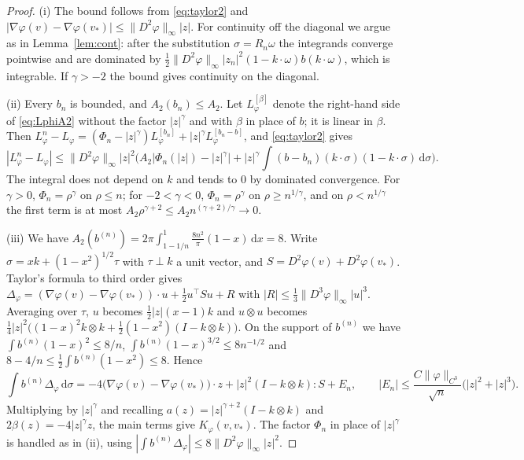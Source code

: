\documentclass[11pt]{amsart}
\theoremstyle{definition}
\newcommand{\dd}{\,\mathrm{d}}
\begin{document}
\begin{proof}
(i) The bound follows from \eqref{eq:taylor2} and $|\nabla\varphi(v)-\nabla\varphi(v_*)|\le\|D^2\varphi\|_\infty|z|$. For continuity off the diagonal we argue as in Lemma~\ref{lem:cont}: after the substitution $\sigma=R_n\omega$ the integrands converge pointwise and are dominated by $\frac12\|D^2\varphi\|_\infty|z_n|^2(1-k\cdot\omega)b(k\cdot\omega)$, which is integrable. If $\gamma>-2$ the bound gives continuity on the diagonal.

(ii) Every $b_n$ is bounded, and $A_2(b_n)\le A_2$. Let $L^{[\beta]}_\varphi$ denote the right-hand side of \eqref{eq:LphiA2} without the factor $|z|^\gamma$ and with $\beta$ in place of $b$; it is linear in $\beta$. Then $L^n_\varphi-L_\varphi=(\Phi_n-|z|^\gamma)L^{[b_n]}_\varphi+|z|^\gamma L^{[b_n-b]}_\varphi$, and \eqref{eq:taylor2} gives
\[
|L^n_\varphi-L_\varphi|\le\|D^2\varphi\|_\infty|z|^2\Big(A_2\big|\Phi_n(|z|)-|z|^\gamma\big|+|z|^\gamma\int(b-b_n)(k\cdot\sigma)(1-k\cdot\sigma)\dd\sigma\Big).
\]
The integral does not depend on $k$ and tends to $0$ by dominated convergence. For $\gamma>0$, $\Phi_n=\rho^\gamma$ on $\rho\le n$; for $-2<\gamma<0$, $\Phi_n=\rho^\gamma$ on $\rho\ge n^{1/\gamma}$, and on $\rho<n^{1/\gamma}$ the first term is at most $A_2\rho^{\gamma+2}\le A_2n^{(\gamma+2)/\gamma}\to0$.

(iii) We have $A_2(b^{(n)})=2\pi\int_{1-1/n}^1\frac{8n^2}\pi(1-x)\dd x=8$. Write $\sigma=xk+(1-x^2)^{1/2}\tau$ with $\tau\perp k$ a unit vector, and $S=D^2\varphi(v)+D^2\varphi(v_*)$. Taylor's formula to third order gives $\Delta_\varphi=(\nabla\varphi(v)-\nabla\varphi(v_*))\cdot u+\frac12u^{\top}Su+R$ with $|R|\le\frac13\|D^3\varphi\|_\infty|u|^3$. Averaging over $\tau$, $u$ becomes $\frac12|z|(x-1)k$ and $u\otimes u$ becomes $\frac14|z|^2\big((1-x)^2k\otimes k+\frac12(1-x^2)(I-k\otimes k)\big)$. On the support of $b^{(n)}$ we have $\int b^{(n)}(1-x)^2\le8/n$, $\int b^{(n)}(1-x)^{3/2}\le8n^{-1/2}$ and $8-4/n\le\frac12\int b^{(n)}(1-x^2)\le8$. Hence
\[
\int b^{(n)}\Delta_\varphi\dd\sigma=-4\big(\nabla\varphi(v)-\nabla\varphi(v_*)\big)\cdot z+|z|^2(I-k\otimes k):S+E_n,\qquad|E_n|\le\frac{C\|\varphi\|_{C^3}}{\sqrt n}\big(|z|^2+|z|^3\big).
\]
Multiplying by $|z|^\gamma$ and recalling $a(z)=|z|^{\gamma+2}(I-k\otimes k)$ and $2\beta(z)=-4|z|^\gamma z$, the main terms give $K_\varphi(v,v_*)$. The factor $\Phi_n$ in place of $|z|^\gamma$ is handled as in (ii), using $|\int b^{(n)}\Delta_\varphi|\le8\|D^2\varphi\|_\infty|z|^2$.
\end{proof}
\end{document}
